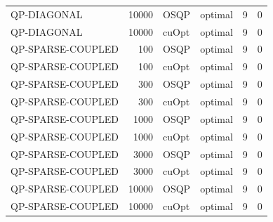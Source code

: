 \begin{table}
\begin{tabular}{lrllrr}
QP-DIAGONAL & 10000 & OSQP & optimal & 9 & 0 \\
QP-DIAGONAL & 10000 & cuOpt & optimal & 9 & 0 \\
QP-SPARSE-COUPLED & 100 & OSQP & optimal & 9 & 0 \\
QP-SPARSE-COUPLED & 100 & cuOpt & optimal & 9 & 0 \\
QP-SPARSE-COUPLED & 300 & OSQP & optimal & 9 & 0 \\
QP-SPARSE-COUPLED & 300 & cuOpt & optimal & 9 & 0 \\
QP-SPARSE-COUPLED & 1000 & OSQP & optimal & 9 & 0 \\
QP-SPARSE-COUPLED & 1000 & cuOpt & optimal & 9 & 0 \\
QP-SPARSE-COUPLED & 3000 & OSQP & optimal & 9 & 0 \\
QP-SPARSE-COUPLED & 3000 & cuOpt & optimal & 9 & 0 \\
QP-SPARSE-COUPLED & 10000 & OSQP & optimal & 9 & 0 \\
QP-SPARSE-COUPLED & 10000 & cuOpt & optimal & 9 & 0 \\
\bottomrule
\end{tabular}
\end{table}
